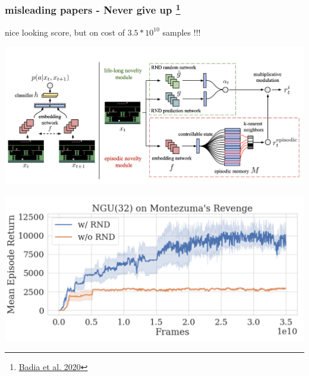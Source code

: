 \documentclass{beamer}
\begin{document}
\begin{frame}
  
  \frametitle{misleading papers - Never give up \footnote{\href{https://arxiv.org/pdf/2002.06038.pdf}{Badia et al. 2020}}}
  nice looking score, but on cost of $3.5*10^{10}$ samples !!!
  
  \centering
  \includegraphics[scale=0.25]{../papers_captions/ngu_block.png}

  \centering
  \includegraphics[scale=0.25]{../papers_captions/ngu_result.png}

\end{frame}
\end{document}
